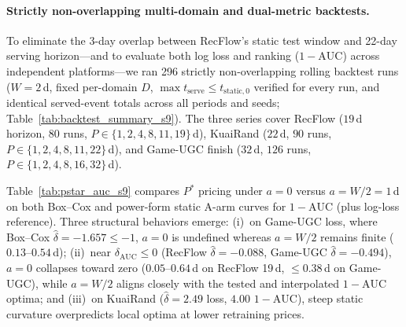 \documentclass[10pt,letterpaper]{article}
\begin{document}
\paragraph{Strictly non-overlapping multi-domain and dual-metric backtests.}
To eliminate the 3-day overlap between RecFlow's static test window and 22-day
serving horizon---and to evaluate both log loss and ranking ($1{-}\mathrm{AUC}$)
across independent platforms---we ran 296 strictly non-overlapping rolling
backtest runs ($W = 2$\,d, fixed per-domain $D$,
$\max t_{\mathrm{serve}} \le t_{\mathrm{static},0}$ verified for every run, and
identical served-event totals across all periods and seeds;
Table~\ref{tab:backtest_summary_s9}). The three series cover RecFlow ($19$\,d
horizon, $80$ runs, $P \in \{1,2,4,8,11,19\}$\,d), KuaiRand ($22$\,d, $90$
runs, $P \in \{1,2,4,8,11,22\}$\,d), and Game-UGC finish ($32$\,d, $126$ runs,
$P \in \{1,2,4,8,16,32\}$\,d).

Table~\ref{tab:pstar_auc_s9} compares $P^\ast$ pricing under $a{=}0$ versus
$a{=}W/2{=}1$\,d on both Box--Cox and power-form static A-arm curves for
$1{-}\mathrm{AUC}$ (plus log-loss reference). Three structural behaviors emerge:
(i)~on Game-UGC loss, where Box--Cox $\hat\delta{=}-1.657 \le -1$, $a{=}0$ is
undefined whereas $a{=}W/2$ remains finite ($0.13$--$0.54$\,d); (ii)~near
$\delta_{\mathrm{AUC}} \le 0$ (RecFlow $\hat\delta{=}-0.088$, Game-UGC
$\hat\delta{=}-0.494$), $a{=}0$ collapses toward zero ($0.05$--$0.64$\,d on
RecFlow 19\,d, $\le 0.38$\,d on Game-UGC), while $a{=}W/2$ aligns closely with
the tested and interpolated $1{-}\mathrm{AUC}$ optima; and (iii)~on KuaiRand
($\hat\delta{=}2.49$ loss, $4.00$ $1{-}\mathrm{AUC}$), steep static curvature
overpredicts local optima at lower retraining prices.
\end{document}
